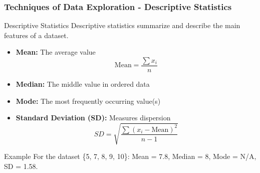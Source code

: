 \documentclass[aspectratio=169]{beamer}
\begin{document}
\begin{frame}[fragile]
    \frametitle{Techniques of Data Exploration - Descriptive Statistics}
    \begin{block}{Descriptive Statistics}
        Descriptive statistics summarize and describe the main features of a dataset.
    \end{block}
    \begin{itemize}
        \item \textbf{Mean:} The average value
        \begin{equation}
            \text{Mean} = \frac{\sum x_i}{n}
        \end{equation}
        \item \textbf{Median:} The middle value in ordered data
        \item \textbf{Mode:} The most frequently occurring value(s)
        \item \textbf{Standard Deviation (SD):} Measures dispersion
        \begin{equation}
            SD = \sqrt{\frac{\sum (x_i - \text{Mean})^2}{n-1}}
        \end{equation}
    \end{itemize}
    \begin{block}{Example}
        For the dataset \{5, 7, 8, 9, 10\}: 
        Mean = 7.8, Median = 8, Mode = N/A, SD = 1.58.
    \end{block}
\end{frame}
\end{document}
